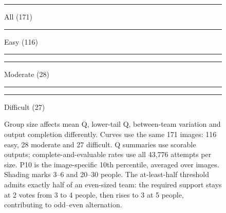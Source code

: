 \begin{figure}[t]
\centering
\setcounter{subfigure}{0}
\begin{minipage}{\textwidth}
\centering
{\footnotesize
\textcolor{figAll}{\rule[2pt]{10pt}{1.2pt}} All (171)\quad
\textcolor{paperBlue}{\rule[2pt]{10pt}{0.7pt}} Easy (116)\quad
\textcolor{figGreen}{\rule[2pt]{4pt}{0.7pt}\hspace{2pt}\rule[2pt]{4pt}{0.7pt}} Moderate (28)\quad
\textcolor{paperOrange}{\rule[2pt]{6pt}{0.7pt}\hspace{2pt}\rule[2pt]{1pt}{0.7pt}} Difficult (27)\par}
\vspace{3pt}
%
\hfill%
%
\hfill%
%
\hfill%

\end{minipage}
\caption{Group size affects mean Q, lower-tail Q, between-team variation and output completion differently. Curves use the same 171 images: 116 easy, 28 moderate and 27 difficult. Q summaries use scorable outputs; complete-and-evaluable rates use all 43,776 attempts per size. P10 is the image-specific 10th percentile, averaged over images. Shading marks 3--6 and 20--30 people. The at-least-half threshold admits exactly half of an even-sized team: the required support stays at 2 votes from 3 to 4 people, then rises to 3 at 5 people, contributing to odd--even alternation.}
\label{fig:group-size-171}
\end{figure}

